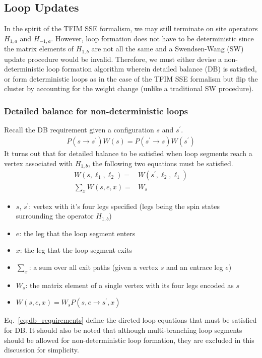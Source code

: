 \documentclass[12pt]{article}
\begin{document}
\subsection{Loop Updates}

In the spirit of the TFIM SSE formalism, we may still terminate on site operators $H_{1,a}$ and $H_{-1,a}$. 
However, loop formation does not have to be deterministic since the matrix elements of $H_{1,b}$ are not all the same and a Swendsen-Wang (SW) update procedure would be invalid.
Therefore, we must either devise a non-deterministic loop formation algorithm wherein detailed balance (DB) is satisfied, or form deterministic loops as in the case of the TFIM SSE formalism but flip the cluster by accounting for the weight change (unlike a traditional SW procedure).

\subsubsection{Detailed balance for non-deterministic loops}

Recall the DB requirement given a configuration $s$ and $s^\prime$.
\begin{align} \label{eq:detailed_balance}
    P(s \rightarrow s^\prime)W(s) = P(s^\prime \rightarrow s)W(s^\prime)
\end{align}
It turns out that for detailed balance to be satisfied when loop segments reach a vertex associated with $H_{1,b}$, the following two equations must be satisfied.
\begin{subequations} \label{eq:db_requirements}
    \begin{align}
        W(s,\ell_1,\ell_2) =& W(s^\prime, \ell_2, \ell_1) \label{eq:db_1} \\
        \sum_x W(s,e,x) =& W_s \label{eq:db_2}
    \end{align}
\end{subequations}
\begin{itemize}
    \item $s$, $s^\prime$: vertex with it's four legs specified (legs being the spin states surrounding the operator $H_{1,b}$) 
    \item $e$: the leg that the loop segment enters
    \item $x$: the leg that the loop segment exits
    \item $\sum_x$: a sum over all exit paths (given a vertex $s$ and an entrace leg $e$)
    \item $W_s$: the matrix element of a single vertex with its four legs encoded as $s$
    \item $W(s,e,x) = W_s P(s,e \rightarrow s^\prime, x)$
\end{itemize}
Eq.~\eqref{eq:db_requirements} define the direted loop equations that must be satisfied for DB. 
It should also be noted that although multi-branching loop segments should be allowed for non-deterministic loop formation, they are excluded in this discussion for simplicity. 
\end{document}
